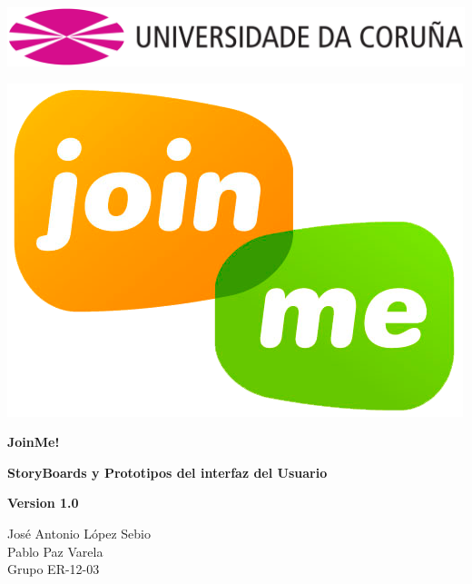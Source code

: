 \documentclass[12pt, a4paper, titlepage]{article}
\begin{document}

\begin{titlepage}

\includegraphics[width=15cm]{Imagenes/Simbolo_logo_UDC.png}

\vspace{3cm}

\begin{center}
\includegraphics[scale=0.3]{Imagenes/1a_Practica_ER_14-15.png}
\end{center}


\begin{flushright}
	
	\LARGE{\textbf{ JoinMe!}}
	
	\LARGE{\textbf{StoryBoards y Prototipos del interfaz del Usuario
	}}
	
	\large{\textbf{Version 1.0}}
	
\end{flushright}

\vspace{1cm}
\begin{center}
José Antonio López Sebio\\
Pablo Paz Varela\\
Grupo ER-12-03\\
\end{center}


\end{titlepage}
\end{document}
